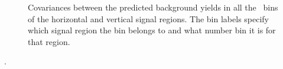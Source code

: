 \begin{figure}[hbtp]
  \centering
  \caption{
    Covariances between the predicted background yields in all the \ETg\ bins of the horizontal and vertical signal regions.
    The bin labels specify which signal region the bin belongs to and what number bin it is for that region.}
  \label{fig:correlation_matrix}
\end{figure}.
